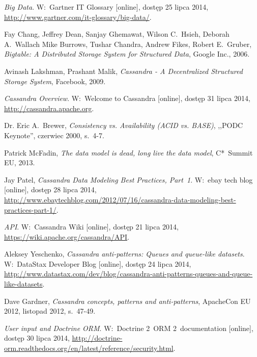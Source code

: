 
\begin{thebibliography}{9}

\emph{Big Data}. W:~Gartner IT Glossary [online], dostęp 25 lipca 2014, \linebreak \url{http://www.gartner.com/it-glossary/big-data/}.

Fay Chang, Jeffrey Dean, Sanjay Ghemawat, Wilson C.~Hsieh, Deborah A.~Wallach Mike Burrows, Tushar Chandra, Andrew Fikes, Robert E.~Gruber, \emph{Bigtable: A Distributed Storage System for Structured Data}, Google Inc., 2006.

Avinash Lakshman, Prashant Malik, \emph{Cassandra - A Decentralized Structured Storage System}, Facebook, 2009.

\emph{Cassandra Overview}. W:~Welcome to Cassandra [online], dostęp 31 lipca 2014, \url{http://cassandra.apache.org}.

Dr. Eric A.~Brewer, \emph{Consistency vs. Availability (ACID vs. BASE)}, ,,PODC Keynote'', czerwiec 2000, s.~4-7.

Patrick McFadin, \emph{The data model is dead, long live the data model}, C*~Summit EU, 2013.

Jay Patel, \emph{Cassandra Data Modeling Best Practices, Part~1}. W:~ebay tech blog [online], dostęp 28 lipca 2014, \url{http://www.ebaytechblog.com/2012/07/16/cassandra-data-modeling-best-practices-part-1/}.

\emph{API}. W:~Cassandra Wiki [online], dostęp 21 lipca 2014, \linebreak \url{https://wiki.apache.org/cassandra/API}.

Aleksey Yeschenko, \emph{Cassandra anti-patterns: Queues and queue-like datasets}. W:~DataStax Developer Blog [online], dostęp 24 lipca 2014, \url{http://www.datastax.com/dev/blog/cassandra-anti-patterns-queues-and-queue-like-datasets}.

Dave Gardner, \emph{Cassandra concepts, patterns and anti-patterns}, ApacheCon EU 2012, listopad 2012, s.~47-49.

\emph{User input and Doctrine ORM}. W:~Doctrine 2~ORM 2~documentation [online], dostęp 30 lipca 2014, \url{http://doctrine-orm.readthedocs.org/en/latest/reference/security.html}.


\end{thebibliography}
